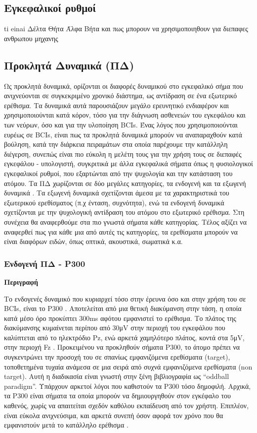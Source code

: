 \documentclass[11pt,a4paper,english,greek,twoside]{../Thesis}
\begin{document}
  \subsection{Εγκεφαλικοί ρυθμοί }
    \par ti einai
    Δέλτα
    Θήτα
    Άλφα
    Βήτα
    και πως μπορουν να χρησιμοποιηθουν για διεπαφες ανθρωπου μηχανης
  \subsection{Προκλητά Δυναμικά (ΠΔ)}  
    \par Ως προκλητά δυναμικά, ορίζονται οι διαφορές δυναμικού στο εγκεφαλικό σήμα που ανιχνεύονται σε συγκεκριμένο χρονικό διάστημα, ως αντίδραση σε ένα εξωτερικό ερέθισμα. Τα δυναμικά αυτά παρουσιάζουν μεγάλο ερευνητικό ενδιαφέρον και χρησιμοποιούνται κατά κόρον, τόσο για την διάγνωση ασθενειών του εγκεφάλου και των νεύρων, όσο και για την υλοποίηση BCIs.  Ένας λόγος που χρησιμοποιούνται ευρέως σε BCIs, είναι πως τα προκλητά δυναμικά μπορούν να αναπαραχθούν κατά βούληση,  κατά την διάρκεια πειραμάτων στα οποία παρέχουμε την κατάλληλη διέγερση, συνεπώς είναι πιο εύκολη η μελέτη τους για την χρήση τους σε διεπαφές εγκεφάλου - υπολογιστή, συγκριτικά με άλλα εγκεφαλικά σήματα όπως η φυσιολογικοί εγκεφαλικοί ρυθμοί, που εξαρτώνται από την ψυχολογία και την κατάσταση του ατόμου.
    Τα ΠΔ χωρίζονται σε δύο μεγάλες κατηγορίες, τα ενδογενή και τα εξωγενή δυναμικά \cite{Sutton1965-nl}.  Τα εξωγενή δυναμικά σχετίζονται άμεσα με τα χαρακτηριστικά του εξωτερικού ερεθίσματος (π.χ ένταση, συχνότητα), ενώ τα ενδογενή δυναμικά σχετίζονται με την ψυχολογική αντίδραση του ατόμου στο εξωτερικό ερέθισμα. Στη συνέχεια θα αναφερθούμε στα πιο γνωστά σήματα κάθε κατηγορίας. Τέλος αξίζει να αναφερθεί πως για κάθε μια από αυτές τις κατηγορίες, τα ερεθίσματα μπορούν να είναι διαφόρων ειδών, όπως οπτικά, ακουστικά, σωματικά κ.α.
    \subsubsection{Ενδογενή ΠΔ - P300}  
      \textbf{Περιγραφή}
      \par Το ενδογενές δυναμικό που κυριαρχεί τόσο στην έρευνα όσο και στην χρήση του σε BCIs, είναι το P300 \cite{Gordeev2007-pu}. Αποτελείται από μια θετική διακύμανση στην τάση, η οποία κατά μέσο όρο προκύπτει 300ms αφότου εμφανιστεί το ερέθισμα. Το πλάτος της διακύμανσης κυμαίνεται περίπου από 30μV στην περιοχή του εγκεφάλου που καλύπτεται από το ηλεκτρόδιο Pz, ενώ αρκετά χαμηλότερο πλάτος, κοντά στα 5μV, στην περιοχή Fz \cite{Perlman2013-sg}. Προκειμένου να προκληθούν σήματα P300, το άτομο πρέπει να συγκεντρώνει την προσοχή του σε σπανίως εμφανιζόμενα ερεθίσματα (target), τοποθετημένα τυχαία ανάμεσα σε μια σειρά από συχνά εμφανιζόμενα ερεθίσματα (non target). Αυτή η διαδικασία είναι γνωστή στην ξένη βιβλιογραφία ως “oddball paradigm”. Υπάρχουν αρκετοί λόγοι που καθιστούν τα P300 τόσο δημοφιλή. Αρχικά, τα P300 είναι σήματα τα οποία μπορούν να δημιουργηθούν στον εγκέφαλο του καθενός, χωρίς να απαιτείται σχεδόν καθόλου εκπαίδευση από τον χρήστη. Επιπλέον, είναι εύκολα ανιχνεύσιμα, και αρκετά συνεπή όσον αφορά τον χρόνο που θα εμφανιστούν μετά το κατάλληλο ερέθισμα \cite{Fazel-Rezai2012-mk}. 
      
\end{document}
